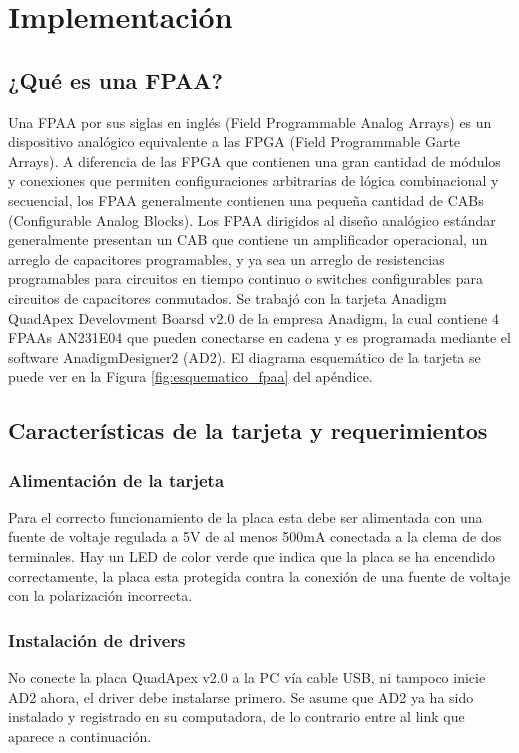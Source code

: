 \chapter{Implementación}

	\section{¿Qué es una FPAA?}
	Una FPAA  por sus siglas en inglés (Field Programmable Analog Arrays) es un dispositivo analógico equivalente a las FPGA (Field Programmable Garte Arrays). A diferencia de las FPGA que contienen una gran cantidad de módulos y conexiones que permiten configuraciones arbitrarias de lógica combinacional y secuencial, los FPAA generalmente contienen una pequeña cantidad de CABs (Configurable Analog Blocks). Los FPAA dirigidos al diseño analógico estándar generalmente presentan un CAB que contiene un amplificador operacional, un arreglo de capacitores programables, y ya sea un arreglo de resistencias programables para circuitos en tiempo continuo o switches configurables para circuitos de capacitores conmutados.
	Se trabajó con la tarjeta Anadigm QuadApex Develovment Boarsd v2.0 de la empresa Anadigm, la cual contiene 4 FPAAs AN231E04 que pueden conectarse en cadena y es programada mediante el software AnadigmDesigner2 (AD2). El diagrama esquemático de la tarjeta se puede ver en la Figura \ref{fig:esquematico_fpaa} del apéndice.
	
	\section{Características de la tarjeta y requerimientos}
	
	\subsection{Alimentación de la tarjeta}
	Para el correcto funcionamiento de la placa esta debe ser alimentada con una fuente de voltaje regulada a 5V de al menos 500mA conectada a la clema de dos terminales. Hay un LED de color verde que indica que la placa se ha encendido correctamente, la placa esta protegida contra la conexión de una fuente de voltaje con la polarización incorrecta.
	
	\subsection{Instalación de drivers}

No conecte la placa QuadApex v2.0 a la PC vía cable USB,  ni tampoco inicie AD2 ahora, el driver debe instalarse primero. Se asume que AD2 ya ha sido instalado y registrado en su computadora, de lo contrario entre al link que aparece a continuación.

